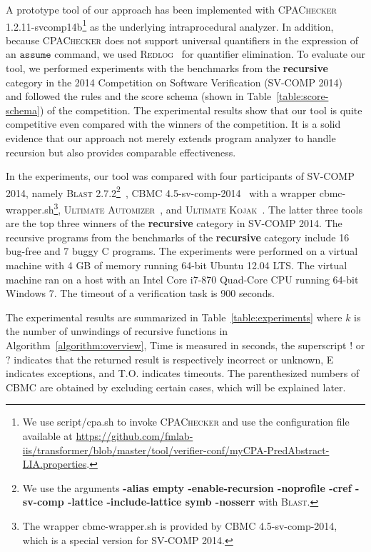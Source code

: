 \newcommand{\safe}{S}
\newcommand{\unsafe}{U}
\newcommand{\unknown}{?}
\newcommand{\exception}{E}
\newcommand{\timeout}{T.O.}
\newcommand{\unknownmark}{\ensuremath{^?}}
\newcommand{\wrongmark}{\ensuremath{^!}}

A prototype tool of our approach has been implemented with
\textsc{CPAChecker} 1.2.11-svcomp14b\footnote{We use script/cpa.sh to
  invoke \textsc{CPAChecker} and use the configuration file
  available at \url{https://github.com/fmlab-iis/transformer/blob/master/tool/verifier-conf/myCPA-PredAbstract-LIA.properties}.} as the underlying
intraprocedural analyzer.
In addition, because \textsc{CPAChecker} does not support universal quantifiers in the expression of an $\mathtt{assume}$ command, we used \textsc{Redlog}~\cite{redlog} for quantifier elimination.
To evaluate our tool, we performed experiments with the benchmarks
from the \textbf{recursive} category in the 2014 Competition on
Software Verification (SV-COMP 2014)~\cite{svcomp14} and followed the
rules and the score schema (shown in Table~\ref{table:score-schema})
of the competition.
The experimental results show that our tool is quite competitive even
compared with the winners of the competition.
It is a solid evidence that our approach not merely extends program
analyzer to handle recursion but also provides comparable
effectiveness.

In the experiments, our tool was compared with four participants of
SV-COMP 2014, namely \textsc{Blast} 2.7.2\footnote{We use the
  arguments \textbf{-alias empty -enable-recursion -noprofile -cref
    -sv-comp -lattice -include-lattice symb -nosserr} with
  \textsc{Blast}.}~\cite{BeyerHJM07},
CBMC 4.5-sv-comp-2014~\cite{ClarkeKL04} with a wrapper
cbmc-wrapper.sh\footnote{The wrapper cbmc-wrapper.sh is provided by
  CBMC 4.5-sv-comp-2014, which is a special version for SV-COMP
  2014.}, \textsc{Ultimate Automizer}~\cite{HeizmannCDEHLNSP13}, and \textsc{Ultimate
Kojak}~\cite{Kojak}.
The latter three tools are the top three winners of the
\textbf{recursive} category in SV-COMP 2014.
The recursive programs from the benchmarks of the \textbf{recursive}
category include 16 bug-free and 7 buggy C programs.
The experiments were performed on a virtual machine with 4 GB of memory
running 64-bit Ubuntu 12.04 LTS. 
The virtual machine ran on a host with an Intel Core i7-870 Quad-Core
CPU running 64-bit Windows 7.
The timeout of a verification task is 900 seconds.

The experimental results are summarized in
Table~\ref{table:experiments} where $k$ is the number of unwindings of
recursive functions in Algorithm~\ref{algorithm:overview}, Time is
measured in seconds, the superscript $!$ or $?$ indicates that the
returned result is respectively incorrect or unknown, E indicates
exceptions, and T.O. indicates timeouts.
The parenthesized numbers of CBMC are obtained by excluding
certain cases, which will be explained later.

